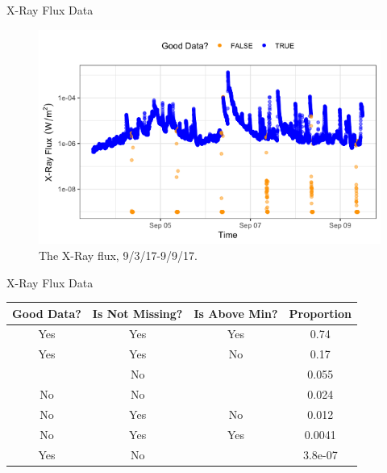 \documentclass{beamer}
\begin{document}
\begin{frame}{X-Ray Flux Data}
    \begin{figure}
        \centering
        \includegraphics[scale=0.5]{flux_20170906.png}
        \caption{The X-Ray flux, 9/3/17-9/9/17.}
        \label{fig:flux_20170906}
    \end{figure}
\end{frame}

\begin{frame}{X-Ray Flux Data}
    \begin{table}[ht]
    \centering
    \begin{tabular}{cccc}
      \hline
    Good Data? & Is Not Missing? & Is Above Min? & Proportion \\ 
      \hline
    Yes & Yes & Yes & 0.74 \\ 
      Yes & Yes & No & 0.17 \\ 
       & No &  & 0.055 \\ 
      No & No &  & 0.024 \\ 
      No & Yes & No & 0.012 \\ 
      No & Yes & Yes & 0.0041 \\ 
      Yes & No &  & 3.8e-07 \\ 
       \hline
    \end{tabular}
    \end{table}
\end{frame}
\end{document}
